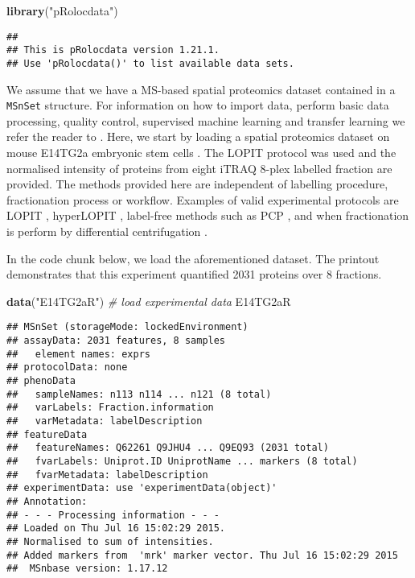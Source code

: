 \documentclass[9pt,a4paper,]{extarticle}
\newenvironment{Shaded}{\begin{snugshade}}{\end{snugshade}}
\newcommand{\CommentTok}[1]{\textcolor[rgb]{0.56,0.35,0.01}{\textit{#1}}}
\newcommand{\KeywordTok}[1]{\textcolor[rgb]{0.13,0.29,0.53}{\textbf{#1}}}
\newcommand{\NormalTok}[1]{#1}
\newcommand{\StringTok}[1]{\textcolor[rgb]{0.31,0.60,0.02}{#1}}
\begin{document}
\begin{Shaded}
\begin{Highlighting}[]
\KeywordTok{library}\NormalTok{(}\StringTok{"pRolocdata"}\NormalTok{)}
\end{Highlighting}
\end{Shaded}

\begin{verbatim}
## 
## This is pRolocdata version 1.21.1.
## Use 'pRolocdata()' to list available data sets.
\end{verbatim}

We assume that we have a MS-based spatial proteomics dataset contained
in a \texttt{MSnSet} structure. For information on how to import data,
perform basic data processing, quality control, supervised machine
learning and transfer learning we refer the reader to
\citep{Breckels:2016b}. Here, we start by loading a spatial proteomics dataset
on mouse E14TG2a embryonic stem cells \citep{Breckels:2016}. The LOPIT protocol
\citep{Dunkley:2004, Dunkley:2006} was used and the normalised intensity of
proteins from eight iTRAQ 8-plex labelled fraction are provided. The
methods provided here are independent of labelling procedure,
fractionation process or workflow. Examples of valid experimental
protocols are LOPIT \citep{Dunkley:2004}, hyperLOPIT \citep{hyper, Mulvey:2017},
label-free methods such as PCP \citep{Foster:2006}, and when fractionation
is perform by differential centrifugation \citep{Itzhak:2016, DC:2018}.

In the code chunk below, we load the aforementioned dataset. The
printout demonstrates that this experiment quantified 2031 proteins
over 8 fractions.

\begin{Shaded}
\begin{Highlighting}[]
\KeywordTok{data}\NormalTok{(}\StringTok{"E14TG2aR"}\NormalTok{) }\CommentTok{# load experimental data}
\NormalTok{E14TG2aR}
\end{Highlighting}
\end{Shaded}

\begin{verbatim}
## MSnSet (storageMode: lockedEnvironment)
## assayData: 2031 features, 8 samples 
##   element names: exprs 
## protocolData: none
## phenoData
##   sampleNames: n113 n114 ... n121 (8 total)
##   varLabels: Fraction.information
##   varMetadata: labelDescription
## featureData
##   featureNames: Q62261 Q9JHU4 ... Q9EQ93 (2031 total)
##   fvarLabels: Uniprot.ID UniprotName ... markers (8 total)
##   fvarMetadata: labelDescription
## experimentData: use 'experimentData(object)'
## Annotation:  
## - - - Processing information - - -
## Loaded on Thu Jul 16 15:02:29 2015. 
## Normalised to sum of intensities. 
## Added markers from  'mrk' marker vector. Thu Jul 16 15:02:29 2015 
##  MSnbase version: 1.17.12
\end{verbatim}
\end{document}
